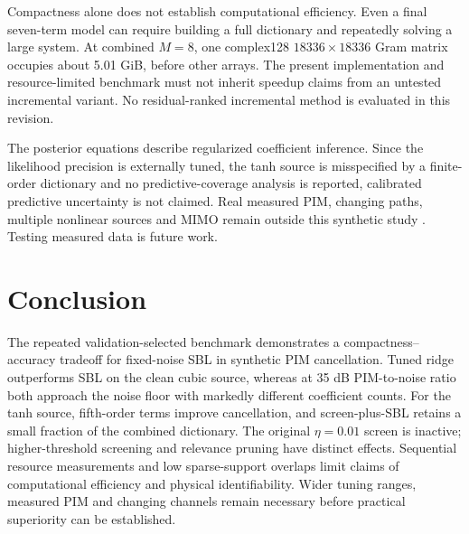 \documentclass[conference]{IEEEtran}
\begin{document}
Compactness alone does not establish computational efficiency. Even a final seven-term model can require building a full dictionary and repeatedly solving a large system. At combined $M=8$, one complex128 $18336\times18336$ Gram matrix occupies about 5.01 GiB, before other arrays. The present implementation and resource-limited benchmark must not inherit speedup claims from an untested incremental variant. No residual-ranked incremental method is evaluated in this revision.

The posterior equations describe regularized coefficient inference. Since the likelihood precision is externally tuned, the tanh source is misspecified by a finite-order dictionary and no predictive-coverage analysis is reported, calibrated predictive uncertainty is not claimed. Real measured PIM, changing paths, multiple nonlinear sources and MIMO remain outside this synthetic study \cite{Lampu2023Algorithms,Lampu2023Cascade}. Testing measured data is future work.

\section{Conclusion}\label{sec:concl}
The repeated validation-selected benchmark demonstrates a compactness--accuracy tradeoff for fixed-noise SBL in synthetic PIM cancellation. Tuned ridge outperforms SBL on the clean cubic source, whereas at 35 dB PIM-to-noise ratio both approach the noise floor with markedly different coefficient counts. For the tanh source, fifth-order terms improve cancellation, and screen-plus-SBL retains a small fraction of the combined dictionary. The original $\eta=0.01$ screen is inactive; higher-threshold screening and relevance pruning have distinct effects. Sequential resource measurements and low sparse-support overlaps limit claims of computational efficiency and physical identifiability. Wider tuning ranges, measured PIM and changing channels remain necessary before practical superiority can be established.



\end{document}
